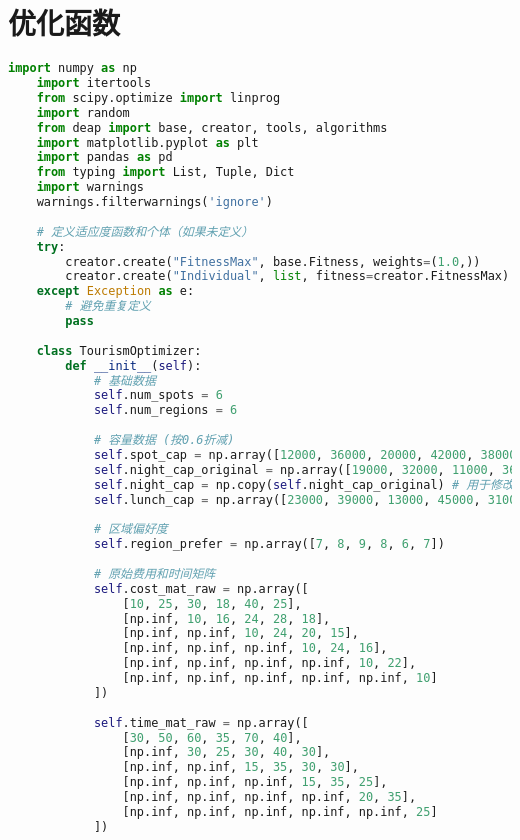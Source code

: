 \section[\hspace{-2pt}优化函数]{{\heiti{} \hspace{-8pt}优化函数}}
\begin{lstlisting}[language=Python]
    import numpy as np
    import itertools
    from scipy.optimize import linprog
    import random
    from deap import base, creator, tools, algorithms
    import matplotlib.pyplot as plt
    import pandas as pd
    from typing import List, Tuple, Dict
    import warnings
    warnings.filterwarnings('ignore')
    
    # 定义适应度函数和个体（如果未定义）
    try:
        creator.create("FitnessMax", base.Fitness, weights=(1.0,))
        creator.create("Individual", list, fitness=creator.FitnessMax)
    except Exception as e:
        # 避免重复定义
        pass
    
    class TourismOptimizer:
        def __init__(self):
            # 基础数据
            self.num_spots = 6
            self.num_regions = 6
            
            # 容量数据 (按0.6折减)
            self.spot_cap = np.array([12000, 36000, 20000, 42000, 38000, 30000]) * 0.6
            self.night_cap_original = np.array([19000, 32000, 11000, 36000, 23000, 22000]) * 0.6
            self.night_cap = np.copy(self.night_cap_original) # 用于修改的容量
            self.lunch_cap = np.array([23000, 39000, 13000, 45000, 31000, 28000]) * 0.6
            
            # 区域偏好度
            self.region_prefer = np.array([7, 8, 9, 8, 6, 7])
            
            # 原始费用和时间矩阵
            self.cost_mat_raw = np.array([
                [10, 25, 30, 18, 40, 25],
                [np.inf, 10, 16, 24, 28, 18],
                [np.inf, np.inf, 10, 24, 20, 15],
                [np.inf, np.inf, np.inf, 10, 24, 16],
                [np.inf, np.inf, np.inf, np.inf, 10, 22],
                [np.inf, np.inf, np.inf, np.inf, np.inf, 10]
            ])
            
            self.time_mat_raw = np.array([
                [30, 50, 60, 35, 70, 40],
                [np.inf, 30, 25, 30, 40, 30],
                [np.inf, np.inf, 15, 35, 30, 30],
                [np.inf, np.inf, np.inf, 15, 35, 25],
                [np.inf, np.inf, np.inf, np.inf, 20, 35],
                [np.inf, np.inf, np.inf, np.inf, np.inf, 25]
            ])
            

\end{lstlisting}
